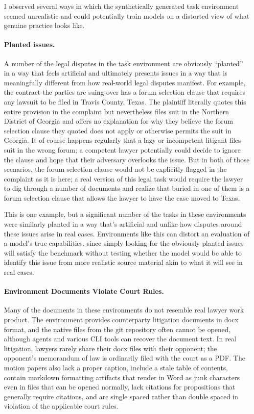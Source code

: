 \documentclass[11pt]{article}
\begin{document}
I observed several ways in which the synthetically generated task environment seemed unrealistic and could potentially train models on a distorted view of what genuine practice looks like. \citep{labtask}

\paragraph{Planted issues.} A number of the legal disputes in the task environment are obviously ``planted'' in a way that feels artificial and ultimately presents issues in a way that is meaningfully different from how real-world legal disputes manifest. For example, the contract the parties are suing over has a forum selection clause that requires any lawsuit to be filed in Travis County, Texas. The plaintiff literally quotes this entire provision in the complaint but nevertheless files suit in the Northern District of Georgia and offers no explanation for why they believe the forum selection clause they quoted does not apply or otherwise permits the suit in Georgia. It of course happens regularly that a lazy or incompetent litigant files suit in the wrong forum; a competent lawyer potentially could decide to ignore the clause and hope that their adversary overlooks the issue. But in both of those scenarios, the forum selection clause would not be explicitly flagged in the complaint as it is here; a real version of this legal task would require the lawyer to dig through a number of documents and realize that buried in one of them is a forum selection clause that allows the lawyer to have the case moved to Texas.

This is one example, but a significant number of the tasks in these environments were similarly planted in a way that's artificial and unlike how disputes around these issues arise in real cases. Environments like this can distort an evaluation of a model's true capabilities, since simply looking for the obviously planted issues will satisfy the benchmark without testing whether the model would be able to identify this issue from more realistic source material akin to what it will see in real cases.

\paragraph{Environment Documents Violate Court Rules.} Many of the documents in these environments do not resemble real lawyer work product. The environment provides counterparty litigation documents in docx format, and the native files from the git repository often cannot be opened, although agents and various CLI tools can recover the document text. In real litigation, lawyers rarely share their docx files with their opponent; the opponent's memorandum of law is ordinarily filed with the court as a PDF. The motion papers also lack a proper caption, include a stale table of contents, contain markdown formatting artifacts that render in Word as junk characters even in files that can be opened normally, lack citations for propositions that generally require citations, and are single spaced rather than double spaced in violation of the applicable court rules.
\end{document}

